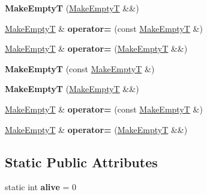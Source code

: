 \begin{DoxyCompactItemize}
\item 
\mbox{\label{struct_make_empty_t_a17aba80a25e892545da341b6ca785bac}} 
{\bfseries Make\+EmptyT} (\mbox{\hyperlink{struct_make_empty_t}{Make\+EmptyT}} \&\&)
\item 
\mbox{\label{struct_make_empty_t_ae6127c67204ecde7fc258957bf158556}} 
\mbox{\hyperlink{struct_make_empty_t}{Make\+EmptyT}} \& {\bfseries operator=} (const \mbox{\hyperlink{struct_make_empty_t}{Make\+EmptyT}} \&)
\item 
\mbox{\label{struct_make_empty_t_a15d3ed474f747901490d5ccaf96fdaae}} 
\mbox{\hyperlink{struct_make_empty_t}{Make\+EmptyT}} \& {\bfseries operator=} (\mbox{\hyperlink{struct_make_empty_t}{Make\+EmptyT}} \&\&)
\item 
\mbox{\label{struct_make_empty_t_acd09df79c616a24591a2cfc077a03a54}} 
{\bfseries Make\+EmptyT} (const \mbox{\hyperlink{struct_make_empty_t}{Make\+EmptyT}} \&)
\item 
\mbox{\label{struct_make_empty_t_a17aba80a25e892545da341b6ca785bac}} 
{\bfseries Make\+EmptyT} (\mbox{\hyperlink{struct_make_empty_t}{Make\+EmptyT}} \&\&)
\item 
\mbox{\label{struct_make_empty_t_ae6127c67204ecde7fc258957bf158556}} 
\mbox{\hyperlink{struct_make_empty_t}{Make\+EmptyT}} \& {\bfseries operator=} (const \mbox{\hyperlink{struct_make_empty_t}{Make\+EmptyT}} \&)
\item 
\mbox{\label{struct_make_empty_t_a15d3ed474f747901490d5ccaf96fdaae}} 
\mbox{\hyperlink{struct_make_empty_t}{Make\+EmptyT}} \& {\bfseries operator=} (\mbox{\hyperlink{struct_make_empty_t}{Make\+EmptyT}} \&\&)
\end{DoxyCompactItemize}
\subsection*{Static Public Attributes}
\begin{DoxyCompactItemize}
\item 
\mbox{\label{struct_make_empty_t_ab351dcbc590b940cb50546d3ce2cc360}} 
static int {\bfseries alive} = 0
\end{DoxyCompactItemize}


